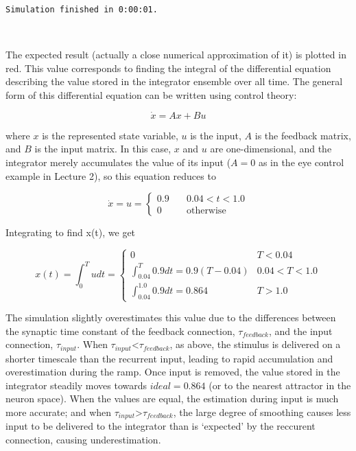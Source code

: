 \documentclass{article}
\begin{document}
    \begin{Verbatim}[commandchars=\\\{\}]
Simulation finished in 0:00:01.
    \end{Verbatim}

    \begin{center}
    \end{center}
    { \hspace*{\fill} \\}
    
The expected result (actually a close numerical approximation of it) is plotted in red. This value corresponds to finding the integral of the differential equation describing the value stored in the integrator ensemble over all time. The general form of this differential equation can be written using control theory:

\begin{equation}
\dot{x} = Ax + Bu
\end{equation}


where $x$ is the represented state variable, $u$ is the input, $A$ is the feedback matrix, and $B$ is the input matrix. In this case, $x$ and $u$ are one-dimensional, and the integrator merely accumulates the value of its input ($A=0$ as in the eye control example in Lecture 2), so this equation reduces to

\begin{equation}
\dot{x} = u = 
  \begin{cases}
  0.9 \quad &0.04<t<1.0 \\
  0 &\mbox{otherwise}
  \end{cases}
\end{equation}


Integrating to find x(t), we get

\begin{equation}
x(t) = \int_0^T u dt =
\begin{cases}
0 \quad &T<0.04 \\
\int_{0.04}^{T} 0.9 dt = 0.9(T-0.04) &0.04<T<1.0 \\
\int_{0.04}^{1.0} 0.9 dt = 0.864 &T>1.0
\end{cases}
\end{equation}

The simulation slightly overestimates this value due to the differences between the synaptic time constant of the feedback connection, $\tau_{feedback}$, and the input connection, $\tau_{input}$. When $\tau_{input}$\textless{}$\tau_{feedback}$, as above, the stimulus is delivered on a shorter timescale than the recurrent input, leading to rapid accumulation and overestimation during the ramp. Once input is removed, the value stored in the integrator steadily moves towards $ideal=0.864$ (or to the nearest attractor in the neuron space). When the values are equal, the estimation during input is much more accurate; and when $\tau_{input}$\textgreater{}$\tau_{feedback}$, the large degree of smoothing causes less input to be delivered to the integrator than is `expected' by the reccurent connection, causing underestimation.
\end{document}
